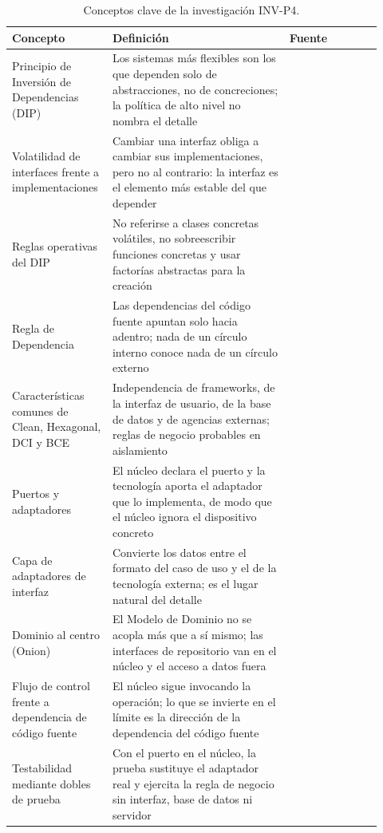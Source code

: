 \begin{table}[htbp]
  \centering
  \footnotesize
  \renewcommand{\arraystretch}{1.2}
  \begin{tabular}{@{}p{0.22\linewidth}p{0.46\linewidth}p{0.24\linewidth}@{}}
    \toprule
    \textbf{Concepto} & \textbf{Definición} & \textbf{Fuente} \\
    \midrule
    \raggedright Principio de Inversión de Dependencias (DIP)
      & \raggedright Los sistemas más flexibles son los que dependen solo de abstracciones, no
        de concreciones; la política de alto nivel no nombra el detalle
      & \raggedright \textcite[87]{martin2017} \tabularnewline
    \raggedright Volatilidad de interfaces frente a implementaciones
      & \raggedright Cambiar una interfaz obliga a cambiar sus implementaciones, pero no al
        contrario: la interfaz es el elemento más estable del que depender
      & \raggedright \textcite[88]{martin2017} \tabularnewline
    \raggedright Reglas operativas del DIP
      & \raggedright No referirse a clases concretas volátiles, no sobreescribir funciones
        concretas y usar factorías abstractas para la creación
      & \raggedright \textcite[89]{martin2017} \tabularnewline
    \raggedright Regla de Dependencia
      & \raggedright Las dependencias del código fuente apuntan solo hacia adentro; nada de un
        círculo interno conoce nada de un círculo externo
      & \raggedright \textcite[203]{martin2017} \tabularnewline
    \raggedright Características comunes de Clean, Hexagonal, DCI y BCE
      & \raggedright Independencia de frameworks, de la interfaz de usuario, de la base de datos
        y de agencias externas; reglas de negocio probables en aislamiento
      & \raggedright \textcite[202]{martin2017} \tabularnewline
    \raggedright Puertos y adaptadores
      & \raggedright El núcleo declara el puerto y la tecnología aporta el adaptador que lo
        implementa, de modo que el núcleo ignora el dispositivo concreto
      & \raggedright \textcite{cockburn2005} \tabularnewline
    \raggedright Capa de adaptadores de interfaz
      & \raggedright Convierte los datos entre el formato del caso de uso y el de la tecnología
        externa; es el lugar natural del detalle
      & \raggedright \textcite[205]{martin2017} \tabularnewline
    \raggedright Dominio al centro (Onion)
      & \raggedright El Modelo de Dominio no se acopla más que a sí mismo; las interfaces de
        repositorio van en el núcleo y el acceso a datos fuera
      & \raggedright \textcite{palermo2008} \tabularnewline
    \raggedright Flujo de control frente a dependencia de código fuente
      & \raggedright El núcleo sigue invocando la operación; lo que se invierte en el límite es
        la dirección de la dependencia del código fuente
      & \raggedright \textcite[87, 91]{martin2017} \tabularnewline
    \raggedright Testabilidad mediante dobles de prueba
      & \raggedright Con el puerto en el núcleo, la prueba sustituye el adaptador real y ejercita
        la regla de negocio sin interfaz, base de datos ni servidor
      & \raggedright \textcite[202]{martin2017} \tabularnewline
    \bottomrule
  \end{tabular}
  \caption{Conceptos clave de la investigación INV-P4.}
  \label{tab:inv-p4-conceptos}
\end{table}

